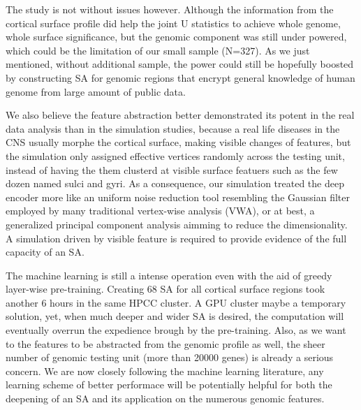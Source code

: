 The study is not without issues however. Although the information from the cortical surface profile did help the joint U statistics to achieve whole genome, whole surface significance, but the genomic component was still under powered, which could be the limitation of our small sample (N=327). As we just mentioned, without additional sample, the power could still be hopefully boosted by constructing SA for genomic regions that encrypt general knowledge of human genome from large amount of public data.

We also believe the feature abstraction better demonstrated its potent in the real data analysis than in the simulation studies, because a real life diseases in the CNS usually morphe the cortical surface, making visible changes of features, but the simulation only assigned effective vertices randomly across the testing unit, instead of having the them clusterd at visible surface featuers such as the few dozen named sulci and gyri. As a consequence, our simulation treated the deep encoder more like an uniform noise reduction tool resembling the Gaussian filter employed by many traditional vertex-wise analysis (VWA), or at best, a generalized principal component analysis aimming to reduce the dimensionality. A simulation driven by visible feature is required to provide evidence of the full capacity of an SA.

The machine learning is still a intense operation even with the aid of greedy layer-wise pre-training. Creating 68 SA for all cortical surface regions took another 6 hours in the same HPCC cluster. A GPU cluster maybe a temporary solution, yet, when much deeper and wider SA is desired, the computation will eventually overrun the expedience brough by the pre-training. Also, as we want to the features to be abstracted from the genomic profile as well, the sheer number of genomic testing unit (more than 20000 genes) is already a serious concern. We are now closely following the machine learning literature, any learning scheme of better performace will be potentially helpful for both the deepening of an SA and its application on the numerous genomic features.